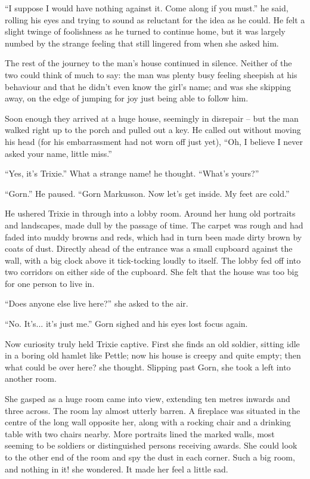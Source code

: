 ``I suppose I would have nothing against it. Come along if you must.'' he said,
rolling his eyes and trying to sound as reluctant for the idea as he could. He
felt a slight twinge of foolishness as he turned to continue home, but it was
largely numbed by the strange feeling that still lingered from when she asked
him.

\scenesep

The rest of the journey to the man's house continued in silence. Neither of the
two could think of much to say: the man was plenty busy feeling sheepish at
his behaviour and that he didn't even know the girl's name; and was she skipping
away, on the edge of jumping for joy just being able to follow him.

Soon enough they arrived at a huge house, seemingly in disrepair -- but the man
walked right up to the porch and pulled out a key. He called out without moving
his head (for his embarrassment had not worn off just yet), ``Oh, I believe I
never asked your name, little miss.''

``Yes, it's Trixie.'' What a strange name! he thought. ``What's yours?''

``Gorn.'' He paused. ``Gorn Markusson. Now let's get inside. My feet are cold.''

He ushered Trixie in through into a lobby room. Around her hung old portraits
and landscapes, made dull by the passage of time. The carpet was rough and had
faded into muddy browns and reds, which had in turn been made dirty brown by
coats of dust. Directly ahead of the entrance was a small cupboard against the
wall, with a big clock above it tick-tocking loudly to itself. The lobby fed off
into two corridors on either side of the cupboard. She felt that the house was
too big for one person to live in.

``Does anyone else live here?'' she asked to the air.

``No. It's... it's just me.'' Gorn sighed and his eyes lost focus again.

Now curiosity truly held Trixie captive. First she finds an old soldier, sitting
idle in a boring old hamlet like Pettle; now his house is creepy and quite
empty; then what could be over here? she thought. Slipping past Gorn, she took a
left into another room.

She gasped as a huge room came into view, extending ten metres inwards and three
across. The room lay almost utterly barren. A fireplace was situated in the
centre of the long wall opposite her, along with a rocking chair and a drinking
table with two chairs nearby. More portraits lined the marked walls, most
seeming to be soldiers or distinguished persons receiving awards. She could look
to the other end of the room and spy the dust in each corner. Such a big room,
and nothing in it! she wondered. It made her feel a little sad.

